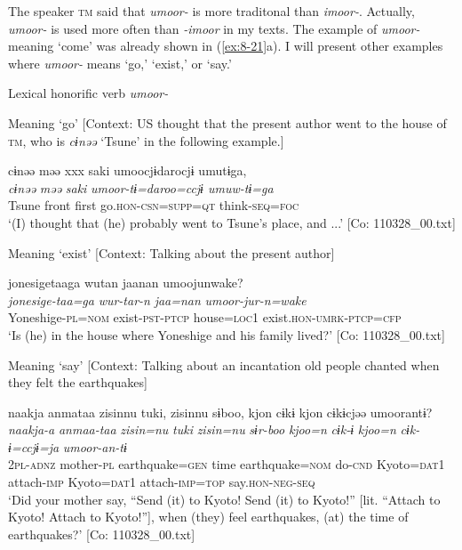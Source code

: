 The speaker \textsc{tm} said that \textit{umoor-} is more traditonal than \textit{imoor-}. Actually, \textit{umoor-} is used more often than \textit{-imoor} in my texts. The example of \textit{umoor-} meaning ‘come’ was already shown in (\ref{ex:8-21}a). I will present other examples where \textit{umoor-} means ‘go,’ ‘exist,’ or ‘say.’

\ea\label{ex:8-22}
  Lexical honorific verb \textit{umoor-}

\ea Meaning ‘go’ [Context: US thought that the present author went to the house of \textsc{tm}, who is \textit{cɨnəə} ‘Tsune’ in the following example.]

   {\US}
\glll   cɨnəə  məə  xxx  saki  umoocjɨdarocjɨ  umutɨga,\\
\textit{cɨnəə}  \textit{məə}    \textit{saki}  \textit{umoor-tɨ=daroo=ccjɨ  umuw-tɨ=ga}\\
Tsune  front    first  go.\textsc{hon}-\textsc{csn}=\textsc{supp}=\textsc{qt}  think-\textsc{seq}=\textsc{foc}\\
\glt ‘(I) thought that (he) probably went to Tsune’s place, and ...’ [Co: 110328\_00.txt]

\ex Meaning ‘exist’ [Context: Talking about the present author]

   {\US}
\glll   jonesigetaaga  wutan  jaanan      umoojunwake?\\
\textit{jonesige-taa=ga}  \textit{wur-tar-n}  \textit{jaa=nan}       \textit{umoor-jur-n=wake} \\
Yoneshige-\textsc{pl}=\textsc{nom}  exist-\textsc{pst}-\textsc{ptcp}  house=\textsc{loc1}   exist.\textsc{hon}-\textsc{umrk}-\textsc{ptcp}=\textsc{cfp}\\
\glt ‘Is (he) in the house where Yoneshige and his family lived?’ [Co: 110328\_00.txt]

\ex Meaning ‘say’ [Context: Talking about an incantation old people chanted when they felt the earthquakes]

{\TM}
\glll  naakja{\footnotemark} anmataa  zisinnu  tuki,  zisinnu  sɨboo,{\footnotemark}  kjon  cɨkɨ  kjon  cɨkɨcjəə  umoorantɨ?\\
\textit{naakja-a}  \textit{anmaa-taa}  \textit{zisin=nu}  \textit{tuki}  \textit{zisin=nu}  \textit{sɨr-boo}      \textit{kjoo=n}  \textit{cɨk-ɨ}  \textit{kjoo=n}  \textit{cɨk-ɨ=ccjɨ=ja}  \textit{umoor-an-tɨ}\\
2\textsc{pl}-\textsc{adnz}  mother-\textsc{pl}  earthquake=\textsc{gen}  time  earthquake=\textsc{nom}  do-\textsc{cnd}    Kyoto=\textsc{dat1}  attach-\textsc{imp}  Kyoto=\textsc{dat1}  attach-\textsc{imp}=\textsc{top}  say.\textsc{hon}-\textsc{neg}-\textsc{seq}\\
\glt ‘Did your mother say, “Send (it) to Kyoto! Send (it) to Kyoto!” [lit. “Attach to Kyoto! Attach to Kyoto!”], when (they) feel earthquakes, (at) the time of earthquakes?’ [Co: 110328\_00.txt]
\z
\z

